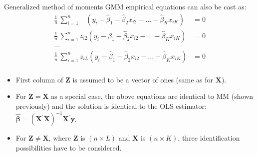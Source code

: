 \documentclass{beamer}
\begin{document}
\begin{frame}{Generalized method of moments}
GMM empirical equations can also be cast as:
\medskip
\footnotesize
\begin{equation*}
\begin{aligned}
\frac{1}{n}\, \sum_{i=1}^n ~~~~\left( y_i - \hat{\beta}_1 - \hat{\beta}_2 x_{i2} - \dots - \hat{\beta}_K x_{iK} \right) &= 0\\
\frac{1}{n}\, \sum_{i=1}^n  z_{i2} \left( y_i - \hat{\beta}_1 - \hat{\beta}_2 x_{i2} - \dots - \hat{\beta}_K x_{iK} \right) &= 0\\
\dots &\\
\frac{1}{n}\, \sum_{i=1}^n z_{iL} \left( y_i - \hat{\beta}_1 - \hat{\beta}_2 x_{i2} - \dots - \hat{\beta}_K x_{iK} \right) &= 0\\
\end{aligned}
\end{equation*}
\medskip
\begin{itemize}
    \item First column of $\bm{Z}$ is assumed to be a vector of ones (same as for $\bm{X}$).
    \smallskip
    \item For $\bm{Z}=\bm{X}$ as a special case, the above equations are identical to MM (shown previously) and the solution is identical to the OLS estimator: $\hat{\bm{\beta}}=(\bm{X}^{\prime}\bm{X})^{-1} \bm{X}^{\prime}\bm{y}$.
    \smallskip
    \item For $\bm{Z} \neq \bm{X}$, where $\bm{Z}$ is $(n\! \times \!L)$ and $\bm{X}$ is $(n \! \times \!K)$, three identification possibilities have to be considered. 
\end{itemize}
\end{frame}
\end{document}
